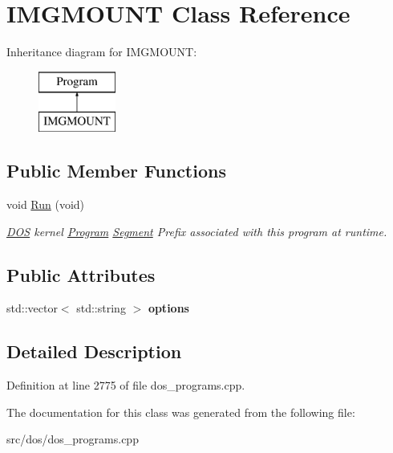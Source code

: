 \hypertarget{classIMGMOUNT}{\section{I\-M\-G\-M\-O\-U\-N\-T Class Reference}
\label{classIMGMOUNT}
}
Inheritance diagram for I\-M\-G\-M\-O\-U\-N\-T\-:\begin{figure}[H]
\begin{center}
\leavevmode
\includegraphics[height=2.000000cm]{classIMGMOUNT}
\end{center}
\end{figure}
\subsection*{Public Member Functions}
\begin{DoxyCompactItemize}
\item 
\hypertarget{classIMGMOUNT_abd99efa1dffda2e6f5640ebcd4781852}{void \hyperlink{classIMGMOUNT_abd99efa1dffda2e6f5640ebcd4781852}{Run} (void)}\label{classIMGMOUNT_abd99efa1dffda2e6f5640ebcd4781852}

\begin{DoxyCompactList}\small\item\em \hyperlink{classDOS}{D\-O\-S} kernel \hyperlink{classProgram}{Program} \hyperlink{structSegment}{Segment} Prefix associated with this program at runtime. \end{DoxyCompactList}\end{DoxyCompactItemize}
\subsection*{Public Attributes}
\begin{DoxyCompactItemize}
\item 
\hypertarget{classIMGMOUNT_aceba1de91e8f82e03f00cfefb0cb8241}{std\-::vector$<$ std\-::string $>$ {\bfseries options}}\label{classIMGMOUNT_aceba1de91e8f82e03f00cfefb0cb8241}

\end{DoxyCompactItemize}


\subsection{Detailed Description}


Definition at line 2775 of file dos\-\_\-programs.\-cpp.



The documentation for this class was generated from the following file\-:\begin{DoxyCompactItemize}
\item 
src/dos/dos\-\_\-programs.\-cpp\end{DoxyCompactItemize}

